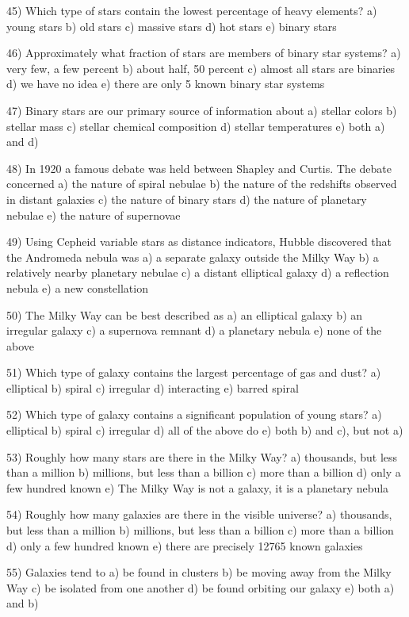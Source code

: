 45) Which type of stars contain the lowest percentage of heavy elements?
a) young stars b) old stars c) massive stars d) hot stars e) binary stars

46) Approximately what fraction of stars are members of binary star systems?
a) very few, a few percent b) about half, 50 percent
c) almost all stars are binaries d) we have no idea
e) there are only 5 known binary star systems

47) Binary stars are our primary source of information about
a) stellar colors b) stellar mass c) stellar chemical composition
d) stellar temperatures e) both a) and d)

48) In 1920 a famous debate was held between Shapley and Curtis.
The debate concerned
a) the nature of spiral nebulae
b) the nature of the redshifts observed in distant galaxies
c) the nature of binary stars
d) the nature of planetary nebulae
e) the nature of supernovae

49) Using Cepheid variable stars as distance indicators,
Hubble discovered that the Andromeda nebula was
a) a separate galaxy outside the Milky Way
b) a relatively nearby planetary nebulae
c) a distant elliptical galaxy
d) a reflection nebula
e) a new constellation

50) The Milky Way can be best described as
a) an elliptical galaxy b) an irregular galaxy c) a supernova remnant
d) a planetary nebula e) none of the above

51) Which type of galaxy contains the largest percentage of gas and dust?
a) elliptical b) spiral c) irregular d) interacting e) barred spiral

52) Which type of galaxy contains a significant population of young stars?
a) elliptical b) spiral c) irregular d) all of the above do
e) both b) and c), but not a)

53) Roughly how many stars are there in the Milky Way?
a) thousands, but less than a million
b) millions, but less than a billion
c) more than a billion
d) only a few hundred known
e) The Milky Way is not a galaxy, it is a planetary nebula

54) Roughly how many galaxies are there in the visible universe?
a) thousands, but less than a million
b) millions, but less than a billion
c) more than a billion
d) only a few hundred known
e) there are precisely 12765 known galaxies

55) Galaxies tend to
a) be found in clusters
b) be moving away from the Milky Way
c) be isolated from one another
d) be found orbiting our galaxy
e) both a) and b)

